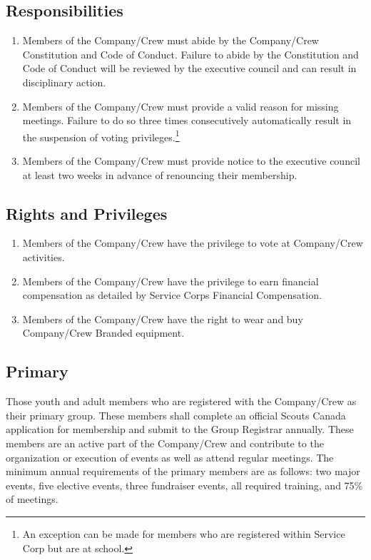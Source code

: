 \documentclass{Service_Corps_Document}
\begin{document}
\subsection{Responsibilities}
\begin{enumerate}
	\item Members of the Company/Crew must abide by the Company/Crew Constitution and Code of Conduct. Failure to abide by the Constitution and Code of Conduct will be reviewed by the executive council and can result in disciplinary action. 
	\item Members of the Company/Crew must provide a valid reason for missing meetings. Failure to do so three times consecutively automatically result in the suspension of voting privileges.\footnote{An exception can be made for members who are registered within Service Corp but are at school.}
	\item Members of the Company/Crew must provide notice to the executive council at least two weeks in advance of renouncing their membership.
\end{enumerate}
\subsection{Rights and Privileges}
\begin{enumerate}
	\item Members of the Company/Crew have the privilege to vote at Company/Crew activities.
	\item Members of the Company/Crew have the privilege to earn financial compensation as detailed by Service Corps Financial Compensation.
	\item Members of the Company/Crew have the right to wear and buy Company/Crew Branded equipment.
\end{enumerate}
\subsection{Primary}
Those youth and adult members who are registered with the Company/Crew as their primary group. These members shall complete an official Scouts Canada application for membership and submit to the Group Registrar annually. These members are an active part of the Company/Crew and contribute to the organization or execution of events as well as attend regular meetings. The minimum annual requirements of the primary members are as follows: two major events, five elective events, three fundraiser events, all required training, and 75\% of meetings.
\end{document}
